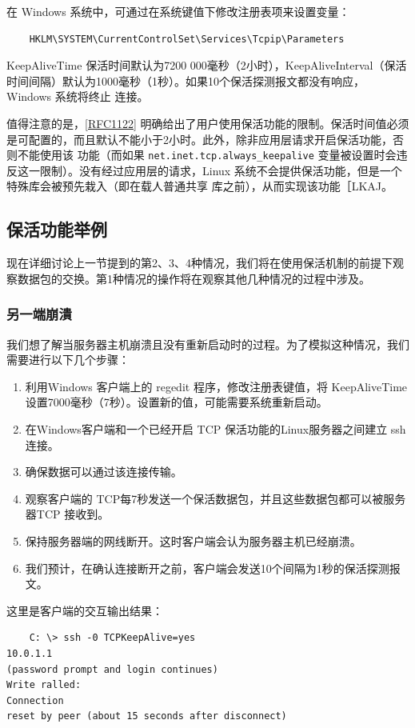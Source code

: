 在 Windows 系统中，可通过在系统键值下修改注册表项来设置变量：
\begin{verbatim}
    HKLM\SYSTEM\CurrentControlSet\Services\Tcpip\Parameters
\end{verbatim}

KeepAliveTime 保活时间默认为7200 000毫秒（2小时），KeepAliveInterval（保活时间间隔）默认为1000毫秒（1秒）。如果10个保活探测报文都没有响应，Windows 系统将终止
连接。

值得注意的是，\href{https://www.rfc-editor.org/rfc/rfc1122}{[RFC1122]} 明确给出了用户使用保活功能的限制。保活时间值必须是可配置的，而且默认不能小于2小时。此外，除非应用层请求开启保活功能，否则不能使用该
功能（而如果 \verb|net.inet.tcp.always_keepalive| 变量被设置时会违反这一限制）。没有经过应用层的请求，Linux 系统不会提供保活功能，但是一个特殊库会被预先栽入（即在载人普通共享
库之前），从而实现该功能［LKAJ。

\subsection{保活功能举例}
现在详细讨论上一节提到的第2、3、4种情况，我们将在使用保活机制的前提下观察数据包的交换。第1种情况的操作将在观察其他几种情况的过程中涉及。
\subsubsection{另一端崩潰}
我们想了解当服务器主机崩溃且没有重新启动时的过程。为了模拟这种情况，我们需要进行以下几个步骤：
\begin{enumerate}
    \item 利用Windows 客户端上的 regedit 程序，修改注册表键值，将 KeepAliveTime 设置7000毫秒（7秒）。设置新的值，可能需要系统重新启动。
    \item 在Windows客户端和一个已经开启 TCP 保活功能的Linux服务器之间建立 ssh 连接。
    \item 确保数据可以通过该连接传输。
    \item 观察客户端的 TCP每7秒发送一个保活数据包，并且这些数据包都可以被服务器TCP 接收到。
    \item 保持服务器端的网线断开。这时客户端会认为服务器主机已经崩溃。
    \item 我们预计，在确认连接断开之前，客户端会发送10个间隔为1秒的保活探测报文。
\end{enumerate}

这里是客户端的交互输出结果：
\begin{verbatim}
    C: \> ssh -0 TCPKeepAlive=yes
10.0.1.1
(password prompt and login continues)
Write ralled:
Connection
reset by peer (about 15 seconds after disconnect)
\end{verbatim}

